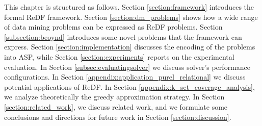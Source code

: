   This chapter is structured as follows. Section \ref{section:framework} introduces the formal ReDF framework. Section \ref{section:dm_problems} shows how a wide range of data mining problems can be expressed as ReDF problems. Section \ref{subsection:beoynd} introduces some novel problems that the framework can express. Section \ref{section:implementation} discusses the encoding of the problems into ASP, while Section \ref{section:experiments} reports on the experimental evaluation. In Section \ref{subsec:evaluatingsolver} we discuss solver's performance configurations. In Section \ref{appendix:application_purel_relational} we discuss potential applications of ReDF. In Section \ref{appendix:k_set_coverage_analysis}, we analyze theoretically the greedy approximation strategy. In Section \ref{section:related_work}, we discuss related work, and we formulate some conclusions and directions for future work in Section \ref{section:discussion}. 

